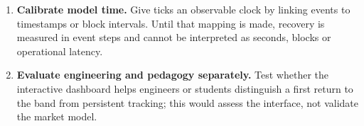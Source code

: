 \begin{enumerate}
  \item \textbf{Calibrate model time.} Give ticks an observable clock by linking events to timestamps or block intervals. Until that mapping is made, recovery is measured in event steps and cannot be interpreted as seconds, blocks or operational latency.
  \item \textbf{Evaluate engineering and pedagogy separately.} Test whether the interactive dashboard helps engineers or students distinguish a first return to the band from persistent tracking; this would assess the interface, not validate the market model.
\end{enumerate}
